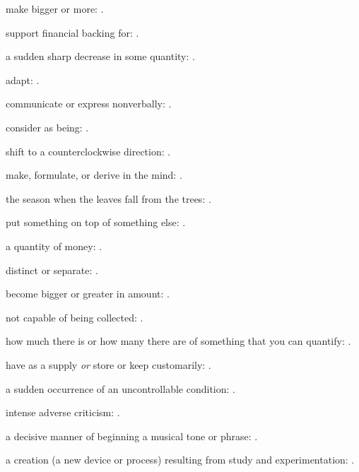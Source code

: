   make bigger or more: .

  support financial backing for: .

  a sudden sharp decrease in some quantity:   .

  adapt: .

  communicate or express nonverbally: .

  consider as being: .

  shift to a counterclockwise direction: .

  make, formulate, or derive in the mind:   .

  the season when the leaves fall from the trees:   .

  put something on top of something else:   .

  a quantity of money:   .

  distinct or separate: .

  become bigger or greater in amount: .

  not capable of being collected:   .

  how much there is or how many there are of something that you can quantify:   .

  have as a supply \textit{or} store or keep customarily: .

  a sudden occurrence of an uncontrollable condition: .

  intense adverse criticism:   .

  a decisive manner of beginning a musical tone or phrase:   .

  a creation (a new device or process) resulting from study and experimentation:   .

